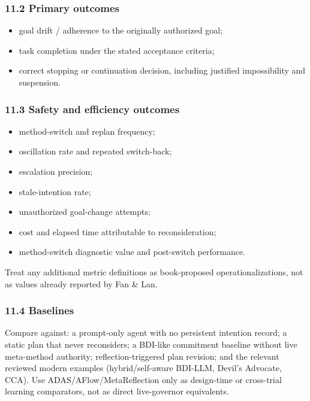 \subsubsection{11.2 Primary outcomes}\label{primary-outcomes}

\begin{itemize}
\tightlist
\item
  goal drift / adherence to the originally authorized goal;
\item
  task completion under the stated acceptance criteria;
\item
  correct stopping or continuation decision, including justified impossibility and suspension.
\end{itemize}

\subsubsection{11.3 Safety and efficiency outcomes}\label{safety-and-efficiency-outcomes}

\begin{itemize}
\tightlist
\item
  method-switch and replan frequency;
\item
  oscillation rate and repeated switch-back;
\item
  escalation precision;
\item
  stale-intention rate;
\item
  unauthorized goal-change attempts;
\item
  cost and elapsed time attributable to reconsideration;
\item
  method-switch diagnostic value and post-switch performance.
\end{itemize}

Treat any additional metric definitions as book-proposed operationalizations, not as values already reported by Fan \& Lan.

\subsubsection{11.4 Baselines}\label{baselines}

Compare against: a prompt-only agent with no persistent intention record; a static plan that never reconsiders; a BDI-like commitment baseline without live meta-method authority; reflection-triggered plan revision; and the relevant reviewed modern examples (hybrid/self-aware BDI-LLM, Devil's Advocate, CCA). Use ADAS/AFlow/MetaReflection only as design-time or cross-trial learning comparators, not as direct live-governor equivalents.

